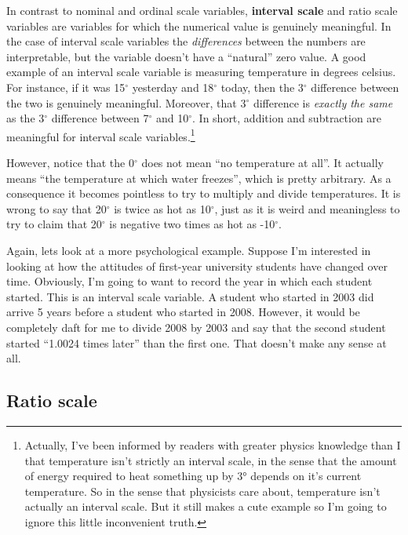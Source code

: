 \documentclass[
]{book}
\begin{document}
In contrast to nominal and ordinal scale variables, \textbf{interval scale} and ratio scale variables are variables for which the numerical value is genuinely meaningful. In the case of interval scale variables the \emph{differences} between the numbers are interpretable, but the variable doesn't have a ``natural'' zero value. A good example of an interval scale variable is measuring temperature in degrees celsius. For instance, if it was 15\(^{\circ}\) yesterday and 18\(^{\circ}\) today, then the 3\(^{\circ}\) difference between the two is genuinely meaningful. Moreover, that 3\(^{\circ}\) difference is \emph{exactly the same} as the 3\(^{\circ}\) difference between 7\(^{\circ}\) and 10\(^{\circ}\). In short, addition and subtraction are meaningful for interval scale variables.\footnote{Actually, I've been informed by readers with greater physics knowledge than I that temperature isn't strictly an interval scale, in the sense that the amount of energy required to heat something up by 3° depends on it's current temperature. So in the sense that physicists care about, temperature isn't actually an interval scale. But it still makes a cute example so I'm going to ignore this little inconvenient truth.}

However, notice that the 0\(^{\circ}\) does not mean ``no temperature at all''. It actually means ``the temperature at which water freezes'', which is pretty arbitrary. As a consequence it becomes pointless to try to multiply and divide temperatures. It is wrong to say that 20\(^{\circ}\) is twice as hot as 10\(^{\circ}\), just as it is weird and meaningless to try to claim that 20\(^{\circ}\) is negative two times as hot as -10\(^{\circ}\).

Again, lets look at a more psychological example. Suppose I'm interested in looking at how the attitudes of first-year university students have changed over time. Obviously, I'm going to want to record the year in which each student started. This is an interval scale variable. A student who started in 2003 did arrive 5 years before a student who started in 2008. However, it would be completely daft for me to divide 2008 by 2003 and say that the second student started ``1.0024 times later'' than the first one. That doesn't make any sense at all.

\hypertarget{ratio-scale}{%
\subsection{Ratio scale}\label{ratio-scale}}
\end{document}
